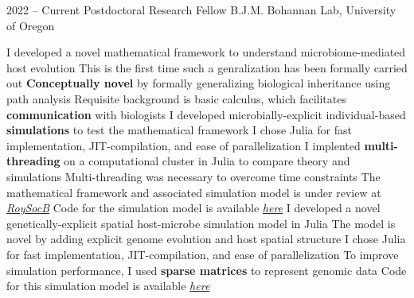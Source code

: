 \documentclass[9pt]{developercv} %
\begin{document}
\vspace{-5 pt}
\begin{entrylist}
	\entry
        {2022 -- Current}
		{Postdoctoral Research Fellow}
		{B.J.M. Bohannan Lab, University of Oregon}
            {\vspace{-10 pt}\begin{outline}[itemize]
                    \1 I developed a novel mathematical framework to understand microbiome-mediated host evolution
                        \vspace{-6 pt} \2[$\cdot$] This is the first time such a genralization has been formally carried out
                        \vspace{-3 pt} \2[$\cdot$] \textbf{Conceptually novel} by formally generalizing biological inheritance using path analysis
                        \vspace{-3 pt} \2[$\cdot$] Requisite background is basic calculus, which facilitates \textbf{communication} with biologists
                    \vspace{-6 pt}\1 I developed microbially-explicit individual-based \textbf{simulations} to test the mathematical framework
                        \vspace{-6 pt} \2[$\cdot$] I chose Julia for fast implementation, JIT-compilation, and ease of parallelization
                    \vspace{-6 pt}\1 I implented \textbf{multi-threading} on a computational cluster in Julia to compare theory and simulations
                        \vspace{-6 pt} \2[$\cdot$] Multi-threading was necessary to overcome time constraints
                    \vspace{-6 pt}\1 The mathematical framework and associated simulation model is under review at \emph{\href{https://royalsocietypublishing.org/journal/rspb}{RoySocB}}
                        \vspace{-6 pt} \2[$\cdot$] Code for the simulation model is available \emph{\href{https://github.com/bobweek/host-microbe-sims}{here}}
                    \vspace{-6 pt}\1 I developed a novel genetically-explicit spatial host-microbe simulation model in Julia
                        \vspace{-6 pt} \2[$\cdot$] The model is novel by adding explicit genome evolution and host spatial structure
                        \vspace{-3 pt} \2[$\cdot$] I chose Julia for fast implementation, JIT-compilation, and ease of parallelization
                        \vspace{-3 pt} \2[$\cdot$] To improve simulation performance, I used \textbf{sparse matrices} to represent genomic data
                        \vspace{-3 pt} \2[$\cdot$] Code for this simulation model is available \emph{\href{https://github.com/bobweek/spatial-genetic-host-microbe}{here}}
                    

\end{outline}}
\end{entrylist}
\end{document}
